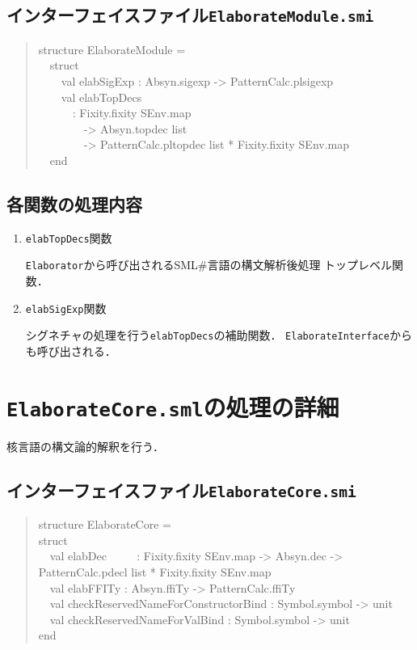 \documentclass{jbook}
\newif\ifjp
\newcommand{\txt}[2]{#1}
\newcommand{\smlsharp}{SML\#}
\newcommand{\code}[1]{\mbox{\large\tt #1}}
\newcommand{\myem}{\mbox{\ \ }}
\newenvironment{program}{\begin{quote}\begin{tt}}%
                        {\end{tt}\end{quote}}
\begin{document}
\subsection{インターフェイスファイル\code{ElaborateModule.smi}}
\begin{program}
structure ElaborateModule =\\
\myem  struct\\
\myem\myem    val elabSigExp : Absyn.sigexp -> PatternCalc.plsigexp\\
\myem\myem    val elabTopDecs\\
\myem\myem\myem        : Fixity.fixity SEnv.map\\
\myem\myem\myem\myem          -> Absyn.topdec list\\
\myem\myem\myem\myem          -> PatternCalc.pltopdec list * Fixity.fixity SEnv.map\\
\myem  end
\end{program}
\subsection{各関数の処理内容}
\begin{enumerate}
\item \code{elabTopDecs}関数

	\code{Elaborator}から呼び出される\smlsharp{}言語の構文解析後処理
トップレベル関数．

\item \code{elabSigExp}関数

	シグネチャの処理を行う\code{elabTopDecs}の補助関数．
	\code{ElaborateInterface}からも呼び出される．

\end{enumerate}
\else%
\fi%


\section{\txt{\code{ElaborateCore.sml}の処理の詳細}{The details of \code{ElaborateCore.sml}}}
\ifjp%

	核言語の構文論的解釈を行う．

\subsection{インターフェイスファイル\code{ElaborateCore.smi}}
\begin{program}
structure ElaborateCore =\\
struct\\
\myem  val elabDec 
\myem\myem
    : Fixity.fixity SEnv.map -> Absyn.dec -> PatternCalc.pdecl list * Fixity.fixity SEnv.map\\
\myem  val elabFFITy : Absyn.ffiTy -> PatternCalc.ffiTy\\
\myem  val checkReservedNameForConstructorBind : Symbol.symbol -> unit\\
\myem  val checkReservedNameForValBind : Symbol.symbol -> unit\\
end
\end{program}
\end{document}
